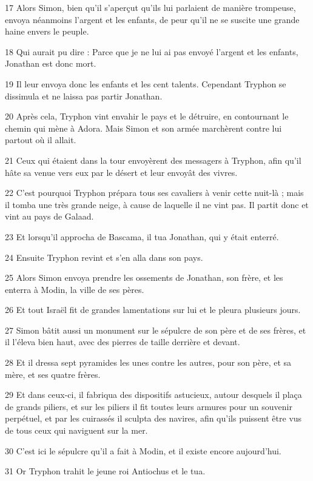 \par 17 Alors Simon, bien qu'il s'aperçut qu'ils lui parlaient de manière trompeuse, envoya néanmoins l'argent et les enfants, de peur qu'il ne se suscite une grande haine envers le peuple.
\par 18 Qui aurait pu dire : Parce que je ne lui ai pas envoyé l'argent et les enfants, Jonathan est donc mort.
\par 19 Il leur envoya donc les enfants et les cent talents. Cependant Tryphon se dissimula et ne laissa pas partir Jonathan.
\par 20 Après cela, Tryphon vint envahir le pays et le détruire, en contournant le chemin qui mène à Adora. Mais Simon et son armée marchèrent contre lui partout où il allait.
\par 21 Ceux qui étaient dans la tour envoyèrent des messagers à Tryphon, afin qu'il hâte sa venue vers eux par le désert et leur envoyât des vivres.
\par 22 C'est pourquoi Tryphon prépara tous ses cavaliers à venir cette nuit-là ; mais il tomba une très grande neige, à cause de laquelle il ne vint pas. Il partit donc et vint au pays de Galaad.
\par 23 Et lorsqu'il approcha de Bascama, il tua Jonathan, qui y était enterré.
\par 24 Ensuite Tryphon revint et s'en alla dans son pays.
\par 25 Alors Simon envoya prendre les ossements de Jonathan, son frère, et les enterra à Modin, la ville de ses pères.
\par 26 Et tout Israël fit de grandes lamentations sur lui et le pleura plusieurs jours.
\par 27 Simon bâtit aussi un monument sur le sépulcre de son père et de ses frères, et il l'éleva bien haut, avec des pierres de taille derrière et devant.
\par 28 Et il dressa sept pyramides les unes contre les autres, pour son père, et sa mère, et ses quatre frères.
\par 29 Et dans ceux-ci, il fabriqua des dispositifs astucieux, autour desquels il plaça de grands piliers, et sur les piliers il fit toutes leurs armures pour un souvenir perpétuel, et par les cuirassés il sculpta des navires, afin qu'ils puissent être vus de tous ceux qui naviguent sur la mer.
\par 30 C'est ici le sépulcre qu'il a fait à Modin, et il existe encore aujourd'hui.
\par 31 Or Tryphon trahit le jeune roi Antiochus et le tua.
